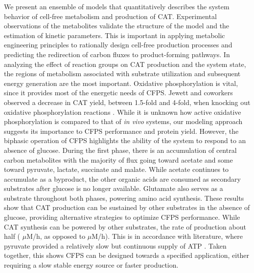 \documentclass[12pt]{article}
\begin{document}
We present an ensemble of models that quantitatively describes the system behavior of cell-free metabolism and production of CAT.
Experimental observations of the metabolites validate the structure of the model and the estimation of kinetic parameters.
This is important in applying metabolic engineering principles to rationally design cell-free production processes and predicting the redirection of carbon fluxes to product-forming pathways.
In analyzing the effect of reaction groups on CAT production and the system state, the regions of metabolism associated with substrate utilization and subsequent energy generation are the most important.
Oxidative phosphorylation is vital, since it provides most of the energetic needs of CFPS.
Jewett and coworkers observed a decrease in CAT yield, between 1.5-fold and 4-fold, when knocking out oxidative phosphorylation reactions \cite{Jewett:2008aa}.
While it is unknown how active oxidative phosphorylation is compared to that of \textit{in vivo} systems, our modeling approach suggests its importance to CFPS performance and protein yield.
However, the biphasic operation of CFPS highlights the ability of the system to respond to an absence of glucose.
During the first phase, there is an accumulation of central carbon metabolites with the majority of flux going toward acetate and some toward pyruvate, lactate, succinate and malate.
While acetate continues to accumulate as a byproduct, the other organic acids are consumed as secondary substrates after glucose is no longer available.
Glutamate also serves as a substrate throughout both phases, powering amino acid synthesis.
These results show that CAT production can be sustained by other substrates in the absence of glucose, providing alternative strategies to optimize CFPS performance.
While CAT synthesis can be powered by other substrates, the rate of production about half ( $\mu$M/h, as opposed to  $\mu$M/h).
This is in accordance with literature, where pyruvate provided a relatively slow but continuous supply of ATP \cite{swartz_nature2001}.
Taken together, this shows CFPS can be designed towards a specified application, either requiring a slow stable energy source or faster production.
\end{document}

